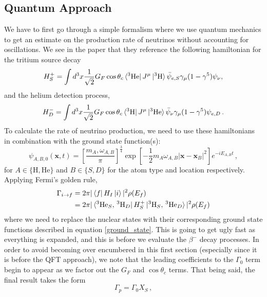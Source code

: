 \documentclass[10pt]{article}
\begin{document}
\subsection{Quantum Approach}
We have to first go through a simple formalism where we use quantum mechanics to get an estimate on the production rate of neutrinos without accounting for oscillations. We see in the paper that they reference the following hamiltonian for the tritium source decay
\begin{equation}\label{source_h}
  H_{S}^{+} = \int d^{3}x\frac{1}{\sqrt{2}}G_{F}\cos\theta_{c}\bra{^{3}\textnormal{He}}J^{\mu}\ket{^{3}\textnormal{H}}\bar{\psi}_{e,S}\gamma_{\mu}(1-\gamma^{5})\psi_{\nu},
\end{equation}
and the helium detection process,
\begin{equation}
  H_{D}^{-} = \int d^{3}x\frac{1}{\sqrt{2}}G_{F}\cos\theta_{c}\bra{^{3}\textnormal{H}}J^{\mu}\ket{^{3}\textnormal{He}}\bar{\psi}_{\nu}\gamma_{\mu}(1-\gamma^{5})\psi_{e,D}\, .
\end{equation}
To calculate the rate of neutrino production, we need to use these hamiltonians in combination with the ground state function(s):
\begin{equation}\label{ground_state}
  \psi_{A,B,0}(\bm{x}, t) = \left[\frac{m_{A},\omega_{A,B}}{\pi}\right]^{\frac{3}{4}}\exp\left[-\frac{1}{2}m_{A}\omega_{A,B}|\bm{x} - \bm{x}_{B}|^{2}\right]e^{-iE_{A,B}t}\, ,
\end{equation}
for $A \in \{\text{H}, \text{He}\}$ and $B\in \{S, D\}$ for the atom type and location respectively. Applying Fermi's golden rule,
\begin{align*}
  \Gamma_{i \to f} & = 2\pi|\bra{f}H_{I}\ket{i}|^{2}\rho(E_{f}) \\
  & = 2\pi|\bra{^{3}\text{He}_{S},\, ^{3}\text{H}_{D}}H_{S}^{+}\ket{^{3}\text{H}_{S},\, ^{3}\text{He}_{D}}|^{2}\rho(E_{f})
\end{align*}
where we need to replace the nuclear states with their corresponding ground state functions described in equation \ref{ground_state}. This is going to get ugly fast as everything is expanded, and this is before we evaluate the $\beta^{-}$ decay processes. In order to avoid becoming over encumbered in this first section (especially since it is before the QFT approach), we note that the leading coefficients to the $\Gamma_{0}$ term begin to appear as we factor out the $G_{F}$ and $\cos\theta_{c}$ terms. That being said, the final result takes the form
\begin{equation}
  \Gamma_{p} = \Gamma_{0}X_{S}\, ,
\end{equation}
\end{document}
